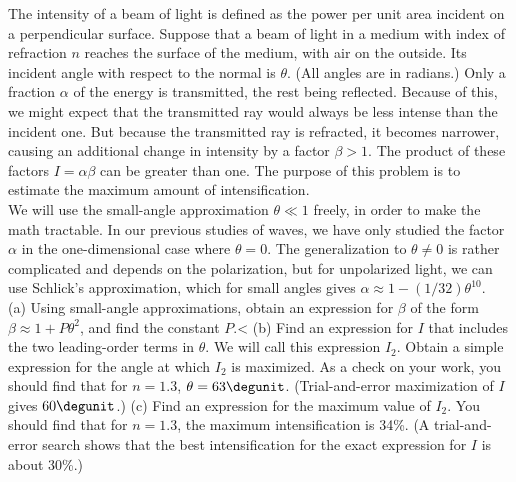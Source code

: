 The intensity of a beam of light is defined as the power per unit area
incident on a perpendicular surface. Suppose that a beam of light in a
medium with index of refraction $n$ reaches the surface of the medium,
with air on the outside. Its incident angle with respect to the normal is $\theta$.
(All angles are in radians.)
Only a fraction $\alpha$ of the energy is
transmitted, the rest being reflected.  Because of this, we might
expect that the transmitted ray would always be less intense than the incident one. But because
the transmitted ray is refracted, it  becomes narrower, causing an additional
change in intensity by a factor $\beta>1$. The product of these factors $I=\alpha\beta$
can be greater than one. The purpose of this problem is to estimate the maximum amount
of intensification.\\
We will use the small-angle approximation $\theta\ll 1$ freely, in order to make
the math tractable. In our previous studies of waves, we have only studied the
factor $\alpha$ in the one-dimensional case where $\theta=0$. The generalization
to $\theta\ne0$ is rather complicated and depends on the polarization,
but for unpolarized light, we can use
Schlick's approximation, which for small angles gives $\alpha\approx 1-(1/32)\theta^{10}$.\\
(a) Using small-angle approximations, obtain an expression for $\beta$ of the form
$\beta\approx 1+P\theta^2$, and find the constant $P$.<%
(b) Find an expression for $I$ that includes the two leading-order terms in $\theta$. We will
call this expression $I_2$.
Obtain a simple expression for the angle at which $I_2$ is maximized.
As a check on your work, you should find that for $n=1.3$, $\theta=63\degunit$. (Trial-and-error
maximization of $I$ gives $60\degunit$.)\hwendpart
(c) Find an expression for the maximum value of $I_2$. You should find that for
$n=1.3$, the maximum intensification is 34\%. (A trial-and-error search shows
that the best intensification for the exact expression for $I$ is about 30\%.)

